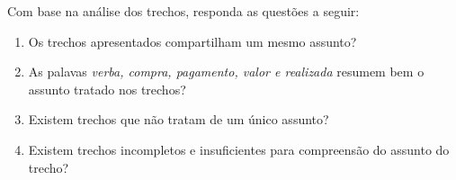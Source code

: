 

\vspace{0.5 cm} 
\noindent Com base na análise dos trechos, responda as questões a seguir:
\vspace{0.5 cm} 


\begin{enumerate}



\item Os trechos apresentados compartilham um mesmo assunto?
\likertB




\item As palavas \textit{verba, compra, pagamento, valor e realizada} resumem bem o assunto tratado nos trechos?
\likertB




\item Existem trechos que não tratam de um único assunto?
\likert




\item Existem trechos incompletos e insuficientes para compreensão do assunto do trecho?
\likertA



\end{enumerate}







%
%
%
%
%
















